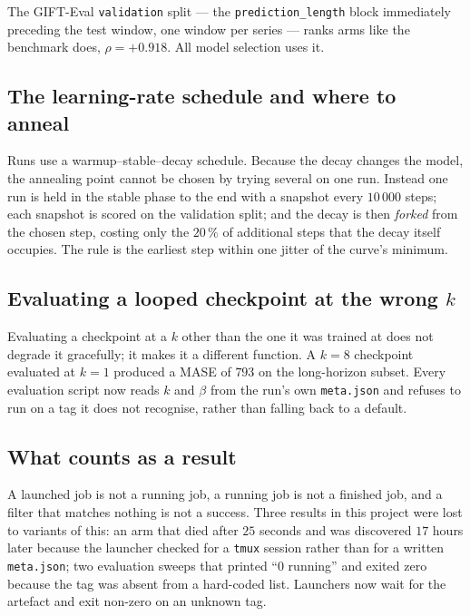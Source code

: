 The GIFT-Eval \texttt{validation} split --- the \texttt{prediction\_length}
block immediately preceding the test window, one window per series --- ranks
arms like the benchmark does, $\rho = +0.918$. All model selection uses it.

\subsection{The learning-rate schedule and where to anneal}

Runs use a warmup--stable--decay schedule. Because the decay changes the model,
the annealing point cannot be chosen by trying several on one run. Instead one
run is held in the stable phase to the end with a snapshot every $10\,000$
steps; each snapshot is scored on the validation split; and the decay is then
\emph{forked} from the chosen step, costing only the $20\,\%$ of additional
steps that the decay itself occupies. The rule is the earliest step within one
jitter of the curve's minimum.


\subsection{Evaluating a looped checkpoint at the wrong \texorpdfstring{$k$}{k}}

Evaluating a checkpoint at a $k$ other than the one it was trained at does not
degrade it gracefully; it makes it a different function. A $k=8$ checkpoint
evaluated at $k=1$ produced a MASE of $793$ on the long-horizon subset. Every
evaluation script now reads $k$ and $\beta$ from the run's own
\texttt{meta.json} and refuses to run on a tag it does not recognise, rather
than falling back to a default.

\subsection{What counts as a result}

A launched job is not a running job, a running job is not a finished job, and a
filter that matches nothing is not a success. Three results in this project
were lost to variants of this: an arm that died after $25$ seconds and was
discovered $17$ hours later because the launcher checked for a \texttt{tmux}
session rather than for a written \texttt{meta.json}; two evaluation sweeps
that printed ``0 running'' and exited zero because the tag was absent from a
hard-coded list. Launchers now wait for the artefact and exit non-zero on an
unknown tag.
